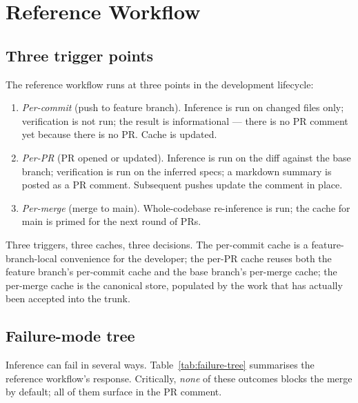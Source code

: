 \section{Reference Workflow}
\label{sec:workflow}

\subsection{Three trigger points}

The reference workflow runs at three points in the development lifecycle:

\begin{enumerate}
    \item \emph{Per-commit} (push to feature branch). Inference is run on changed files only; verification is not run; the result is informational --- there is no PR comment yet because there is no PR. Cache is updated.
    \item \emph{Per-PR} (PR opened or updated). Inference is run on the diff against the base branch; verification is run on the inferred specs; a markdown summary is posted as a PR comment. Subsequent pushes update the comment in place.
    \item \emph{Per-merge} (merge to main). Whole-codebase re-inference is run; the cache for main is primed for the next round of PRs.
\end{enumerate}

Three triggers, three caches, three decisions. The per-commit cache is a feature-branch-local convenience for the developer; the per-PR cache reuses both the feature branch's per-commit cache and the base branch's per-merge cache; the per-merge cache is the canonical store, populated by the work that has actually been accepted into the trunk.

\subsection{Failure-mode tree}

Inference can fail in several ways. Table~\ref{tab:failure-tree} summarises the reference workflow's response. Critically, \emph{none} of these outcomes blocks the merge by default; all of them surface in the PR comment.


